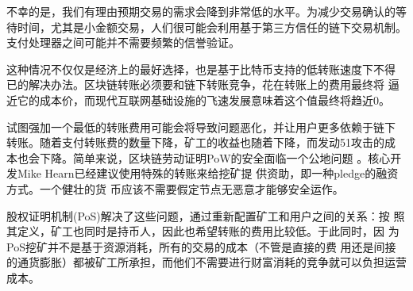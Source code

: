 \documentclass[letterpaper]{article}
\begin{document}
不幸的是，我们有理由预期交易的需求会降到非常低的水平。为减少交易确认的等待时间，尤其是小金额交易，人们很可能会利用基于第三方信任的链下交易机制。
支付处理器之间可能并不需要频繁的信誉验证。

这种情况不仅仅是经济上的最好选择，也是基于比特币支持的低转账速度下不得
已的解决办法。区块链转账必须要和链下转账竞争，花在转账上的费用最终将
逼近它的成本价，而现代互联网基础设施的飞速发展意味着这个值最终将趋近0。

试图强加一个最低的转账费用可能会将导致问题恶化，并让用户更多依赖于链下
转账。随着支付转账费的数量下降，矿工的收益也随着下降，而发动51攻击的成
本也会下降。简单来说，区块链劳动证明PoW的安全面临一个公地问题
\cite{btccommons}。核心开发Mike Hearn已经建议使用特殊的转账来给挖矿提
供资助，即一种pledge的融资方式\cite{dominantassurance}。一个健壮的货
币应该不需要假定节点无恶意才能够安全运作。

股权证明机制(PoS)解决了这些问题，通过重新配置矿工和用户之间的关系：按
照其定义，矿工也同时是持币人，因此也希望转账的费用比较低。于此同时，因
为PoS挖矿并不是基于资源消耗，所有的交易的成本（不管是直接的费
  用还是间接的通货膨胀）都被矿工所承担，而他们不需要进行财富消耗的竞争就可以负担运营成本。
\end{document}
